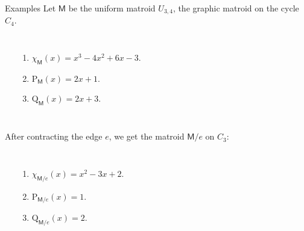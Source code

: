 \documentclass[final]{beamer}
\newlength{\onecolwid}
\newcommand{\M}{\mathsf{M}}
\begin{document}
\begin{frame}[t]
\begin{columns}[t]
\begin{column}{\onecolwid}
\begin{block}{Examples}
    Let $\M$ be the uniform matroid $U_{3,4}$, the
    graphic matroid on the cycle $C_4$.
    \vspace{-20mm}
    \begin{columns}[t]
        \begin{center}
        \end{center}
        \begin{enumerate}
            \item $\chi_\M(x) = x^3 - 4x^2 + 6x - 3$.
            \item $\mathrm{P}_\M(x) = 2x + 1$.
            \item $\mathrm{Q}_\M(x) = 2x + 3$.
        \end{enumerate}
    \end{columns}
\end{block}
\vspace{-10mm}
After contracting the edge \(e\), we get the matroid \(\M/e\) on \(C_3\):
\vspace{-10mm}
\begin{columns}[t]
    \begin{center}
    \end{center}
    \begin{enumerate}
        \item $\chi_{\M/e}(x) = x^2 - 3x + 2$.
        \item $\mathrm{P}_{\M/e}(x) = 1$.
        \item $\mathrm{Q}_{\M/e}(x) = 2$.
    \end{enumerate}

\end{columns}
\end{column}
\end{columns}
\end{frame}
\end{document}
